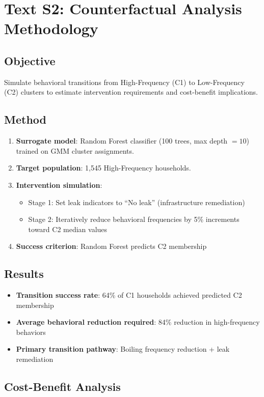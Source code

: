 \documentclass[a4paper,12pt]{article}
\begin{document}
\section{Text S2: Counterfactual Analysis Methodology}

\subsection{Objective}
Simulate behavioral transitions from High-Frequency (C1) to Low-Frequency (C2) clusters to estimate intervention requirements and cost-benefit implications.

\subsection{Method}
\begin{enumerate}
    \item \textbf{Surrogate model}: Random Forest classifier (100 trees, max depth $= 10$) trained on GMM cluster assignments.
    \item \textbf{Target population}: 1,545 High-Frequency households.
    \item \textbf{Intervention simulation}: 
    \begin{itemize}
        \item Stage 1: Set leak indicators to ``No leak'' (infrastructure remediation)
        \item Stage 2: Iteratively reduce behavioral frequencies by 5\% increments toward C2 median values
    \end{itemize}
    \item \textbf{Success criterion}: Random Forest predicts C2 membership
\end{enumerate}

\subsection{Results}
\begin{itemize}
    \item \textbf{Transition success rate}: 64\% of C1 households achieved predicted C2 membership
    \item \textbf{Average behavioral reduction required}: 84\% reduction in high-frequency behaviors
    \item \textbf{Primary transition pathway}: Boiling frequency reduction + leak remediation
\end{itemize}

\subsection{Cost-Benefit Analysis}
\end{document}
